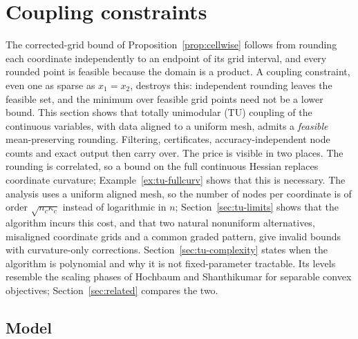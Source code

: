 \section{Coupling constraints}\label{sec:constraints}

The corrected-grid bound of Proposition~\ref{prop:cellwise} follows from
rounding each coordinate independently to an endpoint of its grid interval,
and every rounded point is feasible because the domain is a product. A coupling constraint, even one as sparse as $x_1=x_2$, destroys
this: independent rounding leaves the feasible set, and the minimum over
feasible grid points need not be a lower bound. This section shows that
totally unimodular (TU) coupling of the continuous variables, with data
aligned to a uniform mesh, admits a \emph{feasible} mean-preserving rounding.
Filtering, certificates, accuracy-independent node counts and exact output
then carry over. The price is visible in two places. The rounding is
correlated, so a bound on the full continuous Hessian replaces coordinate
curvature; Example~\ref{ex:tu-fullcurv} shows that this is necessary. The
analysis uses a uniform aligned mesh, so the number of nodes per coordinate
is of order $\sqrt{n_c\kappa_c}$ instead of logarithmic in $n$;
Section~\ref{sec:tu-limits} shows that the algorithm incurs this cost, and
that two natural nonuniform alternatives, misaligned coordinate grids and a
common graded pattern, give invalid bounds with curvature-only corrections.
Section~\ref{sec:tu-complexity} states when the algorithm is polynomial and
why it is not fixed-parameter tractable. Its levels resemble the scaling
phases of Hochbaum and Shanthikumar \cite{HochbaumShanthikumar1990} for
separable convex objectives; Section~\ref{sec:related} compares the two.

\subsection{Model}\label{sec:tu-model}

